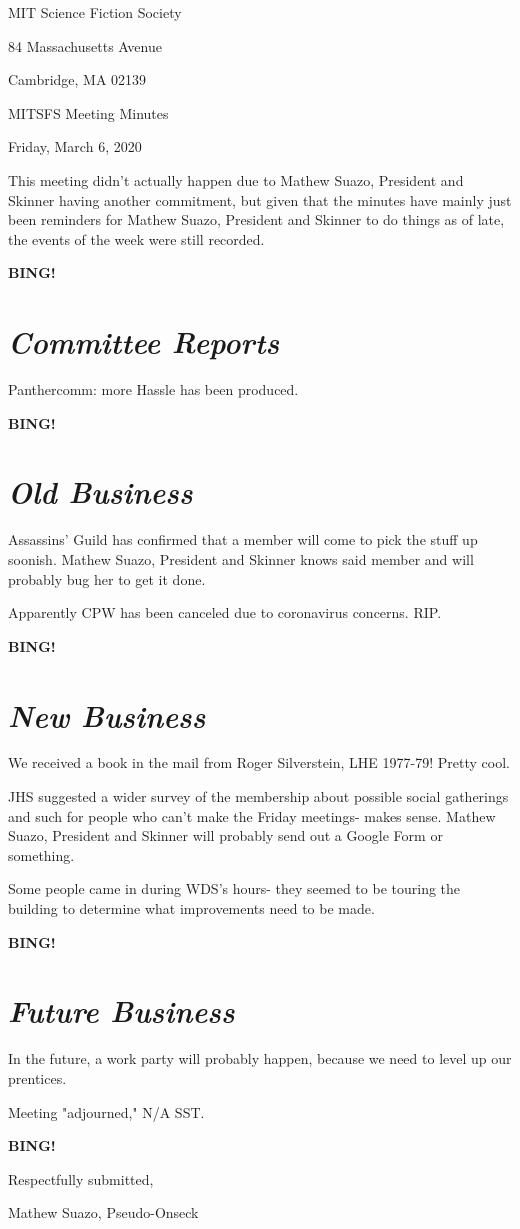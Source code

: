 \documentclass[10pt]{article}
\newcommand{\bing}{{\bf BING!} }
\newcommand{\goto}[1]{\bing \vskip 12pt \section*{{\em{#1}}}}
\newcommand{\skinner}{Mathew Suazo, President and Skinner\xspace}
\newcommand{\onseck}{Mathew Suazo, Pseudo-Onseck\xspace}
\newcommand{\meetingdate}{Friday, March 6, 2020}
\begin{document}
\begin{center}

MIT Science Fiction Society

84 Massachusetts Avenue

Cambridge, MA 02139

\vspace{12pt}

MITSFS Meeting Minutes

\meetingdate

\end{center}

\vspace{18pt}

\setlength{\parskip}{6pt}

\noindent
This meeting didn't actually happen due to \skinner having another commitment, but given that the minutes have mainly just been reminders for \skinner to do things as of late, the events of the week were still recorded.

\goto{Committee Reports}

Panthercomm: more Hassle has been produced.

\goto{Old Business}

Assassins' Guild has confirmed that a member will come to pick the stuff up soonish. \skinner knows said member and will probably bug her to get it done.

Apparently CPW has been canceled due to coronavirus concerns. RIP.

\goto{New Business}

We received a book in the mail from Roger Silverstein, LHE 1977-79! Pretty cool.

JHS suggested a wider survey of the membership about possible social gatherings and such for people who can't make the Friday meetings- makes sense. \skinner will probably send out a Google Form or something.

Some people came in during WDS's hours- they seemed to be touring the building to determine what improvements need to be made.

\goto{Future Business}

In the future, a work party will probably happen, because we need to level up our prentices.

\noindent
Meeting "adjourned," N/A SST.

\bing
\vspace{18pt}

\centerline{Respectfully submitted,}
\centerline{\onseck}
\end{document}

